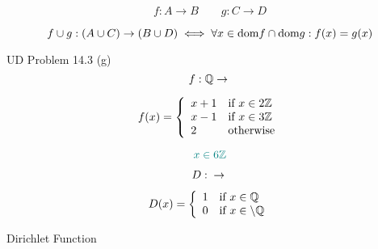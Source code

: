 \begin{frame}{}
  \[
    f: A \to B \qquad g: C \to D
  \]

  \begin{center}
  \end{center}

  \pause
  \begin{theorem}
    \[
      f \cup g: (A \cup C) \to (B \cup D) \iff
      \forall x \in \text{dom}{f} \cap \text{dom}{g}: f(x) = g(x)
    \]
  \end{theorem}

  \pause
  \begin{exampleblock}{UD Problem 14.3 (g)}
    \[
      f: \mathbb{Q} \to \real{}
    \]

    \[
      f(x) = \left\{\begin{array}{ll}
	x + 1 & \text{if } x \in 2\mathbb{Z}{} \\
	x - 1 & \text{if } x \in 3\mathbb{Z}{} \\
	2     & \text{otherwise}
      \end{array}\right.
    \]
  \end{exampleblock}

  \pause
  \vspace{-0.30cm}
  \[
    \textcolor{teal}{x \in 6\mathbb{Z}{}}
  \]
\end{frame}

%
%

\begin{frame}{}
  \[
    D: \real{} \to \real{}
  \]

  \[
    D(x) = \left\{\begin{array}{ll}
      1 & \text{if } x \in \mathbb{Q} \\
      0 & \text{if } x \in \real \setminus \mathbb{Q}
    \end{array}\right.
  \]

  \vspace{0.60cm}
  \centerline{Dirichlet Function}
\end{frame}

